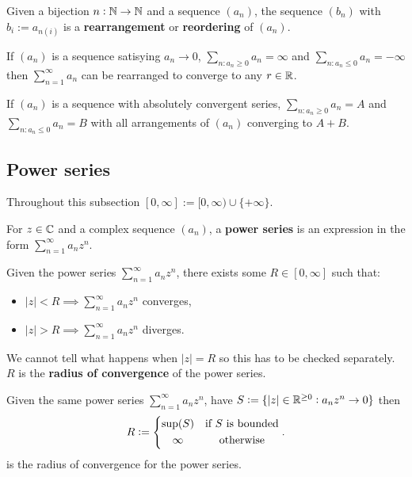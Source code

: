 \documentclass[../Year1.tex]{subfiles}
\begin{document}
\begin{definition}[Reordering]
    Given a bijection $n:\mathbb{N}\rightarrow\mathbb{N}$ and a sequence $(a_n)$, the sequence $(b_n)$ with $b_i:=a_{n(i)}$ is a \textbf{rearrangement} or \textbf{reordering} of $(a_n)$.
\end{definition}

\begin{theorem}
    If $(a_n)$ is a sequence satisying $a_n\rightarrow0$, $\displaystyle\sum_{n:a_n\geq0} a_n = \infty$ and $\displaystyle\sum_{n:a_n\leq0} a_n = -\infty$ then $\displaystyle\sum_{n=1}^\infty a_n$ can be rearranged to converge to any $r\in\mathbb{R}$. 
\end{theorem}

\begin{theorem}
    If $(a_n)$ is a sequence with absolutely convergent series, $\displaystyle\sum_{n:a_n\geq0} a_n = A$ and $\displaystyle\sum_{n:a_n\leq0} a_n = B$ with all arrangements of $(a_n)$ converging to $A+B$.
\end{theorem}
 
\subsection{Power series}
Throughout this subsection $[0,\infty] := [0,\infty)\cup\{+\infty\}$.

\begin{definition}
    For $z\in\mathbb{C}$ and a complex sequence $(a_n)$, a \textbf{power series} is an expression in the form $\displaystyle\sum_{n=1}^\infty a_nz^n$.
\end{definition}

\begin{definition}
    Given the power series $\displaystyle\sum_{n=1}^\infty a_nz^n$, there exists some $R\in[0,\infty]$ such that: \begin{itemize}
        \item $|z|<R \implies \displaystyle\sum_{n=1}^\infty a_nz^n$ converges,
        \item $|z|>R \implies \displaystyle\sum_{n=1}^\infty a_nz^n$ diverges.
    \end{itemize}
    We cannot tell what happens when $|z|=R$ so this has to be checked separately. $R$ is the \textbf{radius of convergence} of the power series.
\end{definition}

\begin{corollary}
    Given the same power series $\displaystyle\sum_{n=1}^\infty a_nz^n$, have $S:= \{|z|\in\mathbb{R}^{\geq0}:a_nz^n\rightarrow0\}$ then \[
    R := \begin{dcases}
        \sup(S) & \text{\textcolor{black}{if }} S \ \text{\textcolor{black}{is bounded}} \\
        \hfil\infty & \hfil\text{\textcolor{black}{otherwise}}
    \end{dcases}
    \textcolor{black}{.}
    \] is the radius of convergence for the power series.
\end{corollary}
\end{document}
